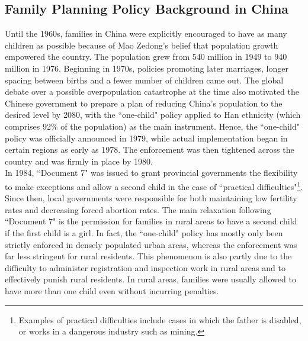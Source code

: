 \documentclass[12pt]{extarticle}
\begin{document}
\subsection{Family Planning Policy Background in China} \label{policybackground}
Until the 1960s, families in China were explicitly encouraged to have as many children as possible because of Mao Zedong's belief that population growth empowered the country. The population grew from 540 million in 1949 to 940 million in 1976. Beginning in 1970s, policies promoting later marriages, longer spacing between births and a fewer number of children came out. The global debate over a possible overpopulation catastrophe at the time also motivated the Chinese government to prepare a plan of reducing China's population to the desired level by 2080, with the ``one-child" policy applied to Han ethnicity (which comprises 92\% of the population) as the main instrument. Hence, the ``one-child" policy was officially announced in 1979, while actual implementation began in certain regions as early as 1978. The enforcement was then tightened across the country and was firmly in place by 1980. \\
\indent In 1984, ``Document 7" was issued to grant provincial governments the flexibility to make exceptions and allow a second child in the case of ``practical difficulties"\footnote{Examples of practical difficulties include cases in which the father is disabled, or works in a dangerous industry such as mining.}. Since then, local governments were responsible for both maintaining low fertility rates and decreasing forced abortion rates. The main relaxation following ``Document 7" is the permission for families in rural areas to have a second child if the first child is a girl. In fact, the ``one-child" policy has mostly only been strictly enforced in densely populated urban areas, whereas the enforcement was far less stringent for rural residents. This phenomenon is also partly due to the difficulty to administer registration and inspection work in rural areas and to effectively punish rural residents. In rural areas, families were usually allowed to have more than one child even without incurring penalties. \\
\end{document}
